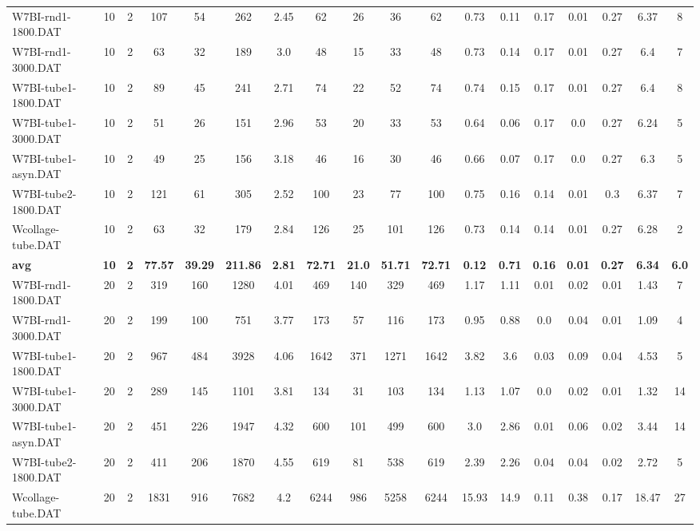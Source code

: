 \begin{sidewaystable}[h]
{\begin{tabular}{lccccccccccccccccc}
W7BI-rnd1-1800.DAT & 10 & 2 & 107 & 54 & 262 & 2.45 & 62 & 26 & 36 & 62 & 0.73 & 0.11 & 0.17 & 0.01 & 0.27 & 6.37 & 8\\
W7BI-rnd1-3000.DAT & 10 & 2 & 63 & 32 & 189 & 3.0 & 48 & 15 & 33 & 48 & 0.73 & 0.14 & 0.17 & 0.01 & 0.27 & 6.4 & 7\\
W7BI-tube1-1800.DAT & 10 & 2 & 89 & 45 & 241 & 2.71 & 74 & 22 & 52 & 74 & 0.74 & 0.15 & 0.17 & 0.01 & 0.27 & 6.4 & 8\\
W7BI-tube1-3000.DAT & 10 & 2 & 51 & 26 & 151 & 2.96 & 53 & 20 & 33 & 53 & 0.64 & 0.06 & 0.17 & 0.0 & 0.27 & 6.24 & 5\\
W7BI-tube1-asyn.DAT & 10 & 2 & 49 & 25 & 156 & 3.18 & 46 & 16 & 30 & 46 & 0.66 & 0.07 & 0.17 & 0.0 & 0.27 & 6.3 & 5\\
W7BI-tube2-1800.DAT & 10 & 2 & 121 & 61 & 305 & 2.52 & 100 & 23 & 77 & 100 & 0.75 & 0.16 & 0.14 & 0.01 & 0.3 & 6.37 & 7\\
Wcollage-tube.DAT & 10 & 2 & 63 & 32 & 179 & 2.84 & 126 & 25 & 101 & 126 & 0.73 & 0.14 & 0.14 & 0.01 & 0.27 & 6.28 & 2\\
\cline{1-18} \textbf{avg} & \textbf{10} & \textbf{2} & \textbf{77.57} & \textbf{39.29} & \textbf{211.86} & \textbf{2.81} & \textbf{72.71} & \textbf{21.0} & \textbf{51.71} & \textbf{72.71} & \textbf{0.12} & \textbf{0.71} & \textbf{0.16} & \textbf{0.01} & \textbf{0.27} & \textbf{6.34} & \textbf{6.0} \\ \cline{1-18}
W7BI-rnd1-1800.DAT & 20 & 2 & 319 & 160 & 1280 & 4.01 & 469 & 140 & 329 & 469 & 1.17 & 1.11 & 0.01 & 0.02 & 0.01 & 1.43 & 7\\
W7BI-rnd1-3000.DAT & 20 & 2 & 199 & 100 & 751 & 3.77 & 173 & 57 & 116 & 173 & 0.95 & 0.88 & 0.0 & 0.04 & 0.01 & 1.09 & 4\\
W7BI-tube1-1800.DAT & 20 & 2 & 967 & 484 & 3928 & 4.06 & 1642 & 371 & 1271 & 1642 & 3.82 & 3.6 & 0.03 & 0.09 & 0.04 & 4.53 & 5\\
W7BI-tube1-3000.DAT & 20 & 2 & 289 & 145 & 1101 & 3.81 & 134 & 31 & 103 & 134 & 1.13 & 1.07 & 0.0 & 0.02 & 0.01 & 1.32 & 14\\
W7BI-tube1-asyn.DAT & 20 & 2 & 451 & 226 & 1947 & 4.32 & 600 & 101 & 499 & 600 & 3.0 & 2.86 & 0.01 & 0.06 & 0.02 & 3.44 & 14\\
W7BI-tube2-1800.DAT & 20 & 2 & 411 & 206 & 1870 & 4.55 & 619 & 81 & 538 & 619 & 2.39 & 2.26 & 0.04 & 0.04 & 0.02 & 2.72 & 5\\
Wcollage-tube.DAT & 20 & 2 & 1831 & 916 & 7682 & 4.2 & 6244 & 986 & 5258 & 6244 & 15.93 & 14.9 & 0.11 & 0.38 & 0.17 & 18.47 & 27\\

\end{tabular}}
\end{sidewaystable}
